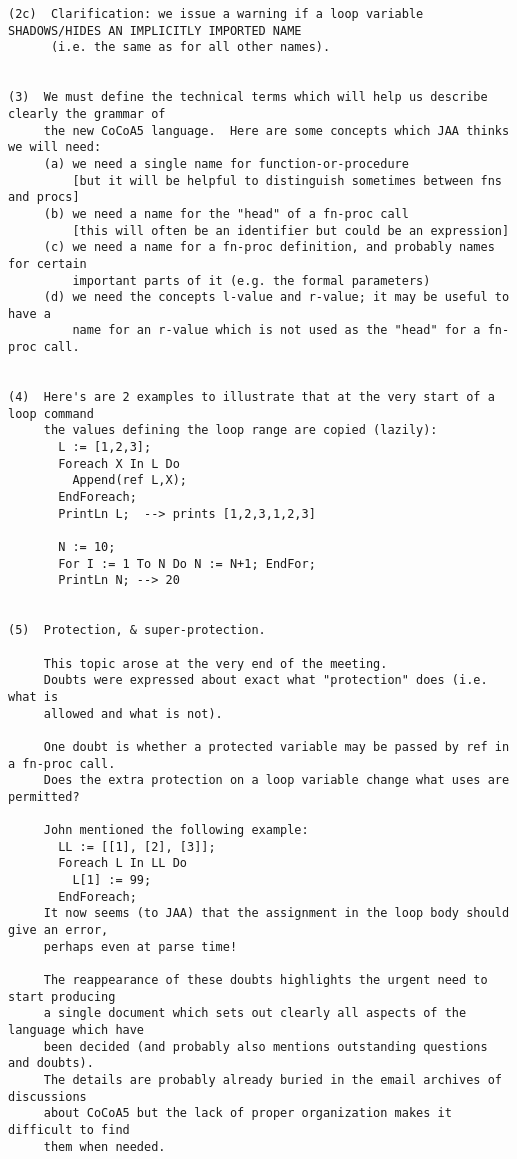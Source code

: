\documentclass{book}[12,a4paper]
\begin{document}
\begin{verbatim}
(2c)  Clarification: we issue a warning if a loop variable SHADOWS/HIDES AN IMPLICITLY IMPORTED NAME
      (i.e. the same as for all other names).


(3)  We must define the technical terms which will help us describe clearly the grammar of
     the new CoCoA5 language.  Here are some concepts which JAA thinks we will need:
     (a) we need a single name for function-or-procedure
         [but it will be helpful to distinguish sometimes between fns and procs]
     (b) we need a name for the "head" of a fn-proc call
         [this will often be an identifier but could be an expression]
     (c) we need a name for a fn-proc definition, and probably names for certain
         important parts of it (e.g. the formal parameters)
     (d) we need the concepts l-value and r-value; it may be useful to have a
         name for an r-value which is not used as the "head" for a fn-proc call.


(4)  Here's are 2 examples to illustrate that at the very start of a loop command
     the values defining the loop range are copied (lazily):
       L := [1,2,3];
       Foreach X In L Do
         Append(ref L,X);
       EndForeach;
       PrintLn L;  --> prints [1,2,3,1,2,3]

       N := 10;
       For I := 1 To N Do N := N+1; EndFor;
       PrintLn N; --> 20


(5)  Protection, & super-protection.

     This topic arose at the very end of the meeting.
     Doubts were expressed about exact what "protection" does (i.e. what is
     allowed and what is not).

     One doubt is whether a protected variable may be passed by ref in a fn-proc call.
     Does the extra protection on a loop variable change what uses are permitted?

     John mentioned the following example:
       LL := [[1], [2], [3]];
       Foreach L In LL Do
         L[1] := 99;
       EndForeach;
     It now seems (to JAA) that the assignment in the loop body should give an error,
     perhaps even at parse time!

     The reappearance of these doubts highlights the urgent need to start producing
     a single document which sets out clearly all aspects of the language which have
     been decided (and probably also mentions outstanding questions and doubts).
     The details are probably already buried in the email archives of discussions
     about CoCoA5 but the lack of proper organization makes it difficult to find
     them when needed.
\end{verbatim}
\end{document}
